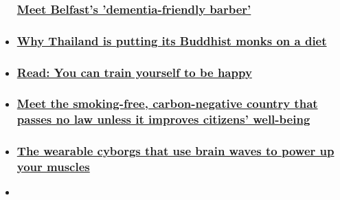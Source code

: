 \begin{itemize}
{  \subsubsection{\texorpdfstring{\href{/2019/11/08/health/dementia-barber-wellness-vital-signs/index.html}{Meet
  Belfast's 'dementia-friendly barber'
  }}{Meet Belfast's 'dementia-friendly barber' }}\label{meet-belfasts-dementia-friendly-barber-}}
\item
  \hypertarget{why-thailand-is-putting-its-buddhist-monks-on-a-diet}{%
  \subsubsection{\texorpdfstring{\href{/2019/10/18/health/thailand-monks-vital-signs-wellness/index.html}{Why
  Thailand is putting its Buddhist monks on a
  diet}}{Why Thailand is putting its Buddhist monks on a diet}}\label{why-thailand-is-putting-its-buddhist-monks-on-a-diet}}
\item
  \hypertarget{read-you-can-train-yourself-to-be-happy}{%
  \subsubsection{\texorpdfstring{\href{/interactive/2019/11/health/parallels/happiness-vital-signs-wellness/}{Read:
  You can train yourself to be
  happy}}{Read: You can train yourself to be happy}}\label{read-you-can-train-yourself-to-be-happy}}
\item
  \hypertarget{meet-the-smoking-free-carbon-negative-country-that-passes-no-law-unless-it-improves-citizens-well-being}{%
  \subsubsection{\texorpdfstring{\href{/2019/09/13/health/bhutan-gross-national-happiness-wellness/index.html}{Meet
  the smoking-free, carbon-negative country that passes no law unless it
  improves citizens'
  well-being}}{Meet the smoking-free, carbon-negative country that passes no law unless it improves citizens' well-being}}\label{meet-the-smoking-free-carbon-negative-country-that-passes-no-law-unless-it-improves-citizens-well-being}}
\item
  \hypertarget{the-wearable-cyborgs-that-use-brain-waves-to-power-up-your-muscles}{%
  \subsubsection{\texorpdfstring{\href{/2019/09/18/health/japan-cyberdyne-brain-wave-exoskeleton-wellness-scn-hnk-intl/index.html}{The
  wearable cyborgs that use brain waves to power up your
  muscles}}{The wearable cyborgs that use brain waves to power up your muscles}}\label{the-wearable-cyborgs-that-use-brain-waves-to-power-up-your-muscles}}
\item
  \hypertarget{read-do-you-eat-too-much-meat}{%
}
\end{itemize}
